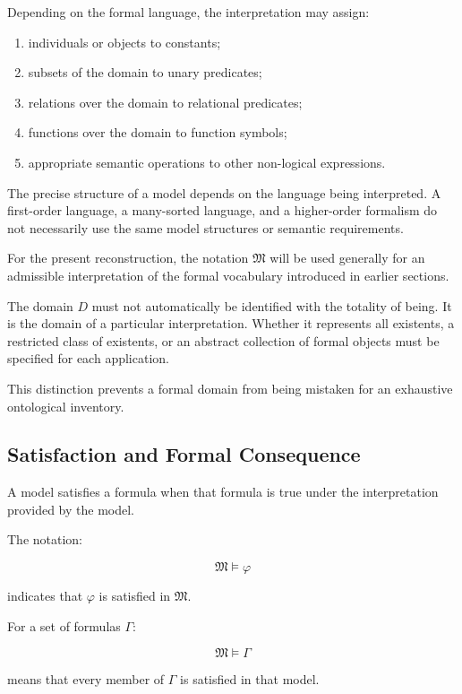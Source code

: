 Depending on the formal language, the interpretation
may assign:

\begin{enumerate}
    \item individuals or objects to constants;
    \item subsets of the domain to unary predicates;
    \item relations over the domain to relational predicates;
    \item functions over the domain to function symbols;
    \item appropriate semantic operations to other
    non-logical expressions.
\end{enumerate}

The precise structure of a model depends on the language
being interpreted. A first-order language, a many-sorted
language, and a higher-order formalism do not necessarily
use the same model structures or semantic requirements.

For the present reconstruction, the notation
\(\mathfrak{M}\) will be used generally for an admissible
interpretation of the formal vocabulary introduced in
earlier sections.

The domain \(D\) must not automatically be identified
with the totality of being. It is the domain of a
particular interpretation. Whether it represents all
existents, a restricted class of existents, or an
abstract collection of formal objects must be specified
for each application.

This distinction prevents a formal domain from being
mistaken for an exhaustive ontological inventory.

\subsection{Satisfaction and Formal Consequence}

A model satisfies a formula when that formula is true
under the interpretation provided by the model.

The notation:

\[
    \mathfrak{M} \models \varphi
\]

indicates that \(\varphi\) is satisfied in
\(\mathfrak{M}\).

For a set of formulas \(\Gamma\):

\[
    \mathfrak{M} \models \Gamma
\]

means that every member of \(\Gamma\) is satisfied
in that model.

